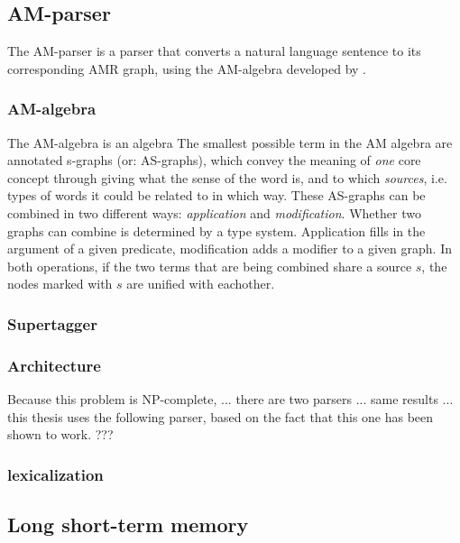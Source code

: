 \documentclass[twocolumn]{article}
\begin{document}
\subsection{AM-parser}
The AM-parser \parencite{groschwitz-etal-2018-amr} is a parser that converts a natural language sentence to its corresponding AMR graph, using the AM-algebra developed by \textcite{GroschwitzThesis}. 
\subsubsection{AM-algebra}
The AM-algebra is an algebra The smallest possible term in the AM algebra are annotated s-graphs (or: AS-graphs), which convey the meaning of \textit{one} core concept through giving what the sense of the word is, and to which \textit{sources}, i.e. types of words it could be related to in which way. These AS-graphs can be combined in two different ways: \textit{application} and \textit{modification}. Whether two graphs can combine is determined by a type system. Application fills in the argument of a given predicate, modification adds a modifier to a given graph. In both operations, if the two terms that are being combined share a source $s$, the nodes marked with $s$ are unified with eachother. 
\subsubsection{Supertagger}
\subsubsection{Architecture}
Because this problem is NP-complete, ... there are two parsers ... same results ... this thesis uses the following parser, based on the fact that this one has been shown to work. ???
\subsubsection{lexicalization}

\subsection{Long short-term memory}
\end{document}
